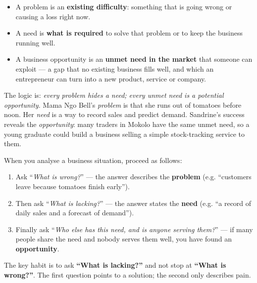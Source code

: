 \documentclass[11pt]{article}
\newcommand{\cle}[1]{{\popxbold\color{popdark}#1}}
\begin{document}
\begin{definition}
\begin{itemize}
\item A \cle{problem} is an \textbf{existing difficulty}: something that is going wrong or causing a loss right now.
\item A \cle{need} is \textbf{what is required} to solve that problem or to keep the business running well.
\item A \cle{business opportunity} is an \textbf{unmet need in the market} that someone can exploit — a gap that no existing business fills well, and which an entrepreneur can turn into a new product, service or company.
\end{itemize}
\end{definition}

The logic is: \emph{every problem hides a need; every unmet need is a potential opportunity.} Mama Ngo Bell's \emph{problem} is that she runs out of tomatoes before noon. Her \emph{need} is a way to record sales and predict demand. Sandrine's success reveals the \emph{opportunity}: many traders in Mokolo have the same unmet need, so a young graduate could build a business selling a simple stock-tracking service to them.

\begin{methode}
When you analyse a business situation, proceed as follows:
\begin{enumerate}
\item Ask ``\emph{What is wrong?}'' — the answer describes the \textbf{problem} (e.g. ``customers leave because tomatoes finish early'').
\item Then ask ``\emph{What is lacking?}'' — the answer states the \textbf{need} (e.g. ``a record of daily sales and a forecast of demand'').
\item Finally ask ``\emph{Who else has this need, and is anyone serving them?}'' — if many people share the need and nobody serves them well, you have found an \textbf{opportunity}.
\end{enumerate}
The key habit is to ask \textbf{``What is lacking?''} and not stop at \textbf{``What is wrong?''}. The first question points to a solution; the second only describes pain.
\end{methode}
\end{document}

